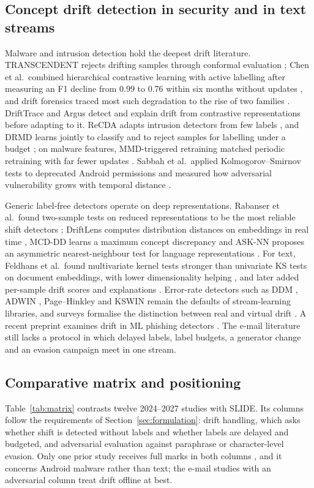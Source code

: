\subsection{Concept drift detection in security and in text streams}
Malware and intrusion detection hold the deepest drift literature. TRANSCENDENT rejects drifting samples through conformal evaluation \cite{barbero2022}; Chen et al.\ combined hierarchical contrastive learning with active labelling after measuring an F1 decline from 0.99 to 0.76 within six months without updates \cite{chen2023usenix}, and drift forensics traced most such degradation to the rise of two families \cite{chow2023}. DriftTrace \cite{pan2026} and Argus \cite{han2026} detect and explain drift from contrastive representations before adapting to it. ReCDA adapts intrusion detectors from few labels \cite{yang2025}, and DRMD learns jointly to classify and to reject samples for labelling under a budget \cite{mcfadden2026}; on malware features, MMD-triggered retraining matched periodic retraining with far fewer updates \cite{berruz2026}. Sabbah et al.\ applied Kolmogorov--Smirnov tests to deprecated Android permissions \cite{sabbah2026} and measured how adversarial vulnerability grows with temporal distance \cite{sabbah2027}.

Generic label-free detectors operate on deep representations. Rabanser et al.\ found two-sample tests on reduced representations to be the most reliable shift detectors \cite{rabanser2019}; DriftLens computes distribution distances on embeddings in real time \cite{greco2025}, MCD-DD learns a maximum concept discrepancy \cite{wan2024} and ASK-NN proposes an asymmetric nearest-neighbour test for language representations \cite{zakharov2026}. For text, Feldhans et al.\ found multivariate kernel tests stronger than univariate KS tests on document embeddings, with lower dimensionality helping \cite{feldhans2021}, and later added per-sample drift scores and explanations \cite{feldhans2024}. Error-rate detectors such as DDM \cite{gama2004}, ADWIN \cite{bifet2007}, Page--Hinkley and KSWIN \cite{raab2020} remain the defaults of stream-learning libraries, and surveys formalise the distinction between real and virtual drift \cite{lu2019,hinder2024}. A recent preprint examines drift in ML phishing detectors \cite{fernando2026}. The e-mail literature still lacks a protocol in which delayed labels, label budgets, a generator change and an evasion campaign meet in one stream.

\subsection{Comparative matrix and positioning}
Table~\ref{tab:matrix} contrasts twelve 2024--2027 studies with SLIDE. Its columns follow the requirements of Section~\ref{sec:formulation}: drift handling, which asks whether shift is detected without labels and whether labels are delayed and budgeted, and adversarial evaluation against paraphrase or character-level evasion. Only one prior study receives full marks in both columns \cite{sabbah2027}, and it concerns Android malware rather than text; the e-mail studies with an adversarial column treat drift offline at best.

